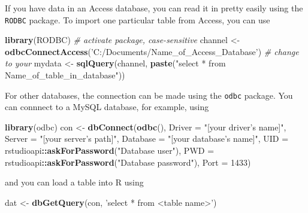\documentclass[12pt,letterpaperpaper,openany]{book}
\newenvironment{Shaded}{\begin{snugshade}}{\end{snugshade}}
\newcommand{\CommentTok}[1]{\textcolor[rgb]{0.56,0.35,0.01}{\textit{#1}}}
\newcommand{\DataTypeTok}[1]{\textcolor[rgb]{0.13,0.29,0.53}{#1}}
\newcommand{\DecValTok}[1]{\textcolor[rgb]{0.00,0.00,0.81}{#1}}
\newcommand{\KeywordTok}[1]{\textcolor[rgb]{0.13,0.29,0.53}{\textbf{#1}}}
\newcommand{\NormalTok}[1]{#1}
\newcommand{\OperatorTok}[1]{\textcolor[rgb]{0.81,0.36,0.00}{\textbf{#1}}}
\newcommand{\StringTok}[1]{\textcolor[rgb]{0.31,0.60,0.02}{#1}}
\begin{document}
If you have data in an Access database, you can read it in pretty easily using
the \texttt{RODBC} package. To import one particular table from Access, you can use

\begin{Shaded}
\begin{Highlighting}[]
\KeywordTok{library}\NormalTok{(RODBC) }\CommentTok{# activate package, case-sensitive}
\NormalTok{channel <-}\StringTok{ }\KeywordTok{odbcConnectAccess}\NormalTok{(}\StringTok{'C:/Documents/Name_of_Access_Database'}\NormalTok{) }\CommentTok{# change to your}
\NormalTok{mydata <-}\StringTok{ }\KeywordTok{sqlQuery}\NormalTok{(channel, }\KeywordTok{paste}\NormalTok{(}\StringTok{"select * from Name_of_table_in_database"}\NormalTok{))}
\end{Highlighting}
\end{Shaded}

For other databases, the connection can be made using the \texttt{odbc} package. You can connnect
to a MySQL database, for example, using

\begin{Shaded}
\begin{Highlighting}[]
\KeywordTok{library}\NormalTok{(odbc)}
\NormalTok{con <-}\StringTok{ }\KeywordTok{dbConnect}\NormalTok{(}\KeywordTok{odbc}\NormalTok{(),}
                 \DataTypeTok{Driver   =} \StringTok{"[your driver's name]"}\NormalTok{,}
                 \DataTypeTok{Server   =} \StringTok{"[your server's path]"}\NormalTok{,}
                 \DataTypeTok{Database =} \StringTok{"[your database's name]"}\NormalTok{,}
                 \DataTypeTok{UID      =}\NormalTok{ rstudioapi}\OperatorTok{::}\KeywordTok{askForPassword}\NormalTok{(}\StringTok{"Database user"}\NormalTok{),}
                 \DataTypeTok{PWD      =}\NormalTok{ rstudioapi}\OperatorTok{::}\KeywordTok{askForPassword}\NormalTok{(}\StringTok{"Database password"}\NormalTok{),}
                 \DataTypeTok{Port     =} \DecValTok{1433}\NormalTok{)}
\end{Highlighting}
\end{Shaded}

and you can load a table into R using

\begin{Shaded}
\begin{Highlighting}[]
\NormalTok{dat <-}\StringTok{ }\KeywordTok{dbGetQuery}\NormalTok{(con, }\StringTok{'select * from <table name>'}\NormalTok{)}
\end{Highlighting}
\end{Shaded}
\end{document}
